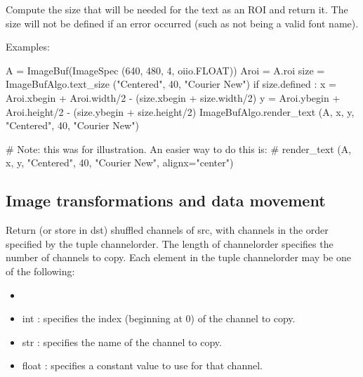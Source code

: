 

Compute the size that will be needed for the text as an ROI and return it.
The size will not be {\cf defined} if an error occurred (such as not being a
valid font name).

\smallskip
\noindent Examples:
\begin{code}
    A = ImageBuf(ImageSpec (640, 480, 4, oiio.FLOAT))
    Aroi = A.roi
    size = ImageBufAlgo.text_size ("Centered", 40, "Courier New")
    if size.defined :
        x = Aroi.xbegin + Aroi.width/2  - (size.xbegin + size.width/2)
        y = Aroi.ybegin + Aroi.height/2 - (size.ybegin + size.height/2)
        ImageBufAlgo.render_text (A, x, y, "Centered", 40, "Courier New")

    # Note: this was for illustration. An easier way to do this is:
    #   render_text (A, x, y, "Centered", 40, "Courier New", alignx="center")
\end{code}
\apiend



\subsection{Image transformations and data movement}
\label{sec:iba:py:transforms}

 

Return (or store in {\cf dst}) shuffled channels of {\cf src}, with channels in
the order specified by the tuple {\cf channelorder}. 
The length of {\cf channelorder} specifies the number of channels to copy.
Each element in the tuple {\cf channelorder} may be one of the following:
\begin{itemize}
\item {}
\item {\cf int} : specifies the index (beginning at 0) of the channel
    to copy.
\item {\cf str} : specifies the name of the channel to copy.
\item {\cf float} : specifies a constant value to use for that channel.
\end{itemize}

